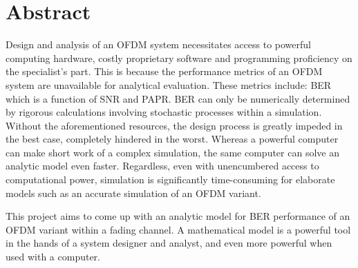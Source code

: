 \chapter*{Abstract}

Design and analysis of an \gls{OFDM} system necessitates access to powerful computing hardware, costly proprietary software and programming proficiency on the specialist's part. This is because the performance metrics of an \gls{OFDM} system are unavailable for analytical evaluation. These metrics include: \gls{BER} which is a function of \gls{SNR} and \gls{PAPR}. \gls{BER} can only be numerically determined by rigorous calculations involving stochastic processes within a simulation. Without the aforementioned resources, the design process is greatly impeded in the best case, completely hindered in the worst. Whereas a powerful computer can make short work of a complex simulation, the same computer can solve an analytic model even faster. Regardless, even with unencumbered access to computational power, simulation is significantly time-consuming for elaborate models such as an accurate simulation of an \gls{OFDM} variant.
 

This project aims to come up with an analytic model for \gls{BER} performance of an \gls{OFDM} variant within a fading channel. A mathematical model is a powerful tool in the hands of a system designer and analyst, and even more powerful when used with a computer.

